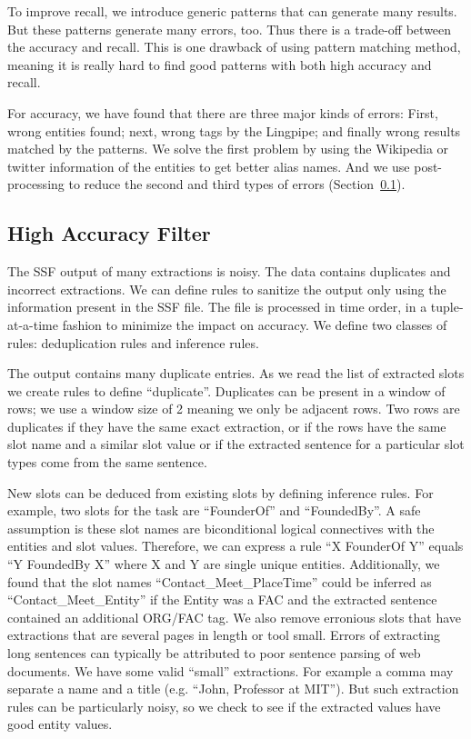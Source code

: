 To improve recall, we introduce generic patterns that can generate many results.
But these patterns generate many errors, too. Thus there is a trade-off 
between the accuracy and recall. This is one drawback of using pattern 
matching method, meaning it is really hard to find good patterns with both 
high accuracy and recall. 

For accuracy, we have found that there are three major kinds of errors: First,  
wrong entities found; next, wrong tags by the Lingpipe; and finally wrong results matched 
by the patterns. We solve the first problem by using the Wikipedia or twitter 
information of the entities to get better alias names. And we use
post-processing to reduce the second and third types of errors (Section~\ref{section:highAccuracyFilter}).

\subsection{High Accuracy Filter}
\label{section:highAccuracyFilter}

The SSF output of many extractions is noisy. The data contains duplicates and 
incorrect extractions. We can define rules to sanitize the output only using 
the information present in the SSF file. The file is processed in time order, 
in a tuple-at-a-time fashion to minimize the impact on accuracy. We define 
two classes of rules: deduplication rules and inference rules.

The output contains many duplicate entries. As we read the list of extracted 
slots we create rules to define ``duplicate''. Duplicates can be present in a 
window of rows; we use a window size of 2 meaning we only be adjacent rows. 
Two rows are duplicates if they have the same exact extraction, or if the 
rows have the same slot name and a similar slot value or if the extracted 
sentence for a particular slot types come from the same sentence.

 New slots can be deduced from existing slots by defining inference rules. 
 For example, two slots for the task are ``FounderOf'' and ``FoundedBy''. A safe 
 assumption is these slot names are biconditional logical connectives with the 
 entities and slot values. Therefore, we can express a rule ``X FounderOf Y'' 
 equals ``Y FoundedBy X'' where X and Y are single unique entities. Additionally,
 we found that the slot names ``Contact\_Meet\_PlaceTime'' could be inferred as
 ``Contact\_Meet\_Entity'' if the Entity was a FAC and the extracted sentence 
 contained an additional ORG/FAC tag.  
We also remove erronious slots that have extractions that are several pages in 
length or tool small. Errors of extracting long sentences can typically be 
attributed to poor sentence parsing of web documents. We have some valid
``small'' extractions. For example a comma may separate a name and a title
(e.g. ``John, Professor at MIT''). But such extraction rules can be particularly 
noisy, so we check to see if the extracted values have good entity values.




